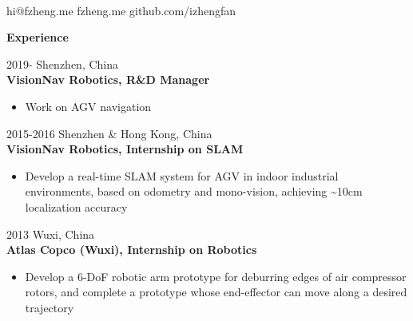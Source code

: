 \documentclass[11pt]{article}
\newcommand{\subsec}[1]{
  \vskip 4pt
  {\bf\large\color{teal}  #1}
  \vskip 1pt
}
\newcommand{\yearspaceevent}[3]{
  {\color{gray} \small #1 \hfill #2}\\
  {\bf #3}
}
\begin{document}

{
   \\
  \faEnvelopeO \space hi@fzheng.me \space\space
  \faLink \space  fzheng.me \space\space
  \faGithub \space github.com/izhengfan
\par}
\noindent
\begin{minipage}[t]{0.6\textwidth}

  \subsec{Experience}

  \yearspaceevent{2019-}{Shenzhen, China}{VisionNav Robotics, R\&D Manager}
  \begin{itemize}
    \item Work on AGV navigation
  \end{itemize}

  \yearspaceevent{2015-2016}{Shenzhen \& Hong Kong, China}{VisionNav Robotics, Internship on SLAM}
  \begin{itemize}
    \item Develop a real-time SLAM system for AGV in indoor industrial environments, based on odometry and mono-vision, achieving \~{}10cm localization accuracy
  \end{itemize}

  \yearspaceevent{2013}{Wuxi, China}{Atlas Copco (Wuxi), Internship on Robotics}
  \begin{itemize}
    \item Develop a 6-DoF robotic arm prototype for deburring edges of air compressor rotors, and complete a prototype whose end-effector can move along a desired trajectory
  \end{itemize}


\end{minipage}
\end{document}
